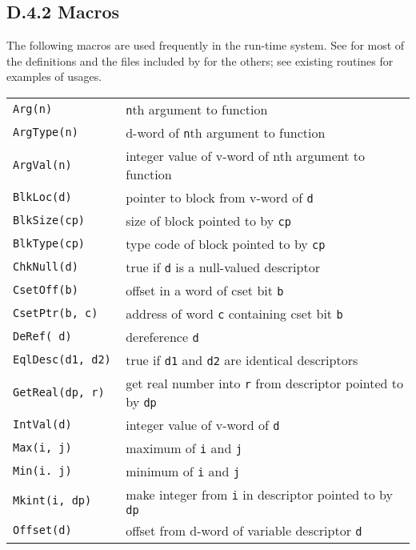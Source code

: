 \subsection[D.4.2 Macros]{D.4.2 Macros}

The following macros are used frequently in the run-time system.  See
 for most of the definitions and the files included by
 for the others; see existing routines for examples of
usages.\\[0.5cm]
{\renewcommand{\arraystretch}{0.9}%
\begin{xtabular}{>{\hspace{1cm}\texttt\bgroup}l<{\egroup}@{\hspace{1cm}}p{11cm}}
Arg(n)            & \hspace{0cm}\texttt{n}th argument to function\\
ArgType(n)        & d-word of \texttt{n}th argument to function\\
ArgVal(n)         & integer value of v-word of nth argument to function\\
BlkLoc(d)         & pointer to block from v-word of \texttt{d}\\
BlkSize(cp)       & size of block pointed to by \texttt{cp}\\
BlkType(cp)       & type code of block pointed to by \texttt{cp}\\
ChkNull(d)        & true if \texttt{d} is a null-valued descriptor\\
CsetOff(b)        & offset in a word of cset bit \texttt{b}\\
CsetPtr(b, c)     & address of word \texttt{c} containing cset bit \texttt{b}\\
DeRef( d)         & dereference \texttt{d}\\
EqlDesc(d1, d2)   & true if \texttt{d1} and \texttt{d2} are identical descriptors\\
GetReal(dp, r)    & get real number into \texttt{r} from
                    descriptor pointed to by \texttt{dp}\\
IntVal(d)         & integer value of v-word of \texttt{d}\\
Max(i, j)         & maximum of \texttt{i} and \texttt{j}\\
Min(i. j)         & minimum of \texttt{i} and \texttt{j}\\
Mkint(i, dp)      & make integer from \texttt{i} in descriptor
                    pointed to by \texttt{dp}\\
Offset(d)         & offset from d-word of variable descriptor \texttt{d}\\

\end{xtabular}}
